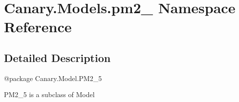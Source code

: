 \hypertarget{namespace_canary_1_1_models_1_1pm2__5}{\section{Canary.\-Models.\-pm2\-\_ Namespace Reference}
\label{namespace_canary_1_1_models_1_1pm2__5}
}


\subsection{Detailed Description}
\begin{DoxyVerb}@package Canary.Model.PM2_5

PM2_5 is a subclass of Model
\end{DoxyVerb}
 